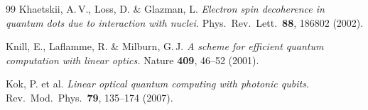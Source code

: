 \begin{thebibliography}{99}
Khaetskii, A.\,V., Loss, D. \& Glazman, L.
\textit{Electron spin decoherence in quantum dots due to interaction with
nuclei.}
Phys.\ Rev.\ Lett.\ \textbf{88}, 186802 (2002).

Knill, E., Laflamme, R. \& Milburn, G.\,J.
\textit{A scheme for efficient quantum computation with linear optics.}
Nature \textbf{409}, 46--52 (2001).

Kok, P. et al.
\textit{Linear optical quantum computing with photonic qubits.}
Rev.\ Mod.\ Phys.\ \textbf{79}, 135--174 (2007).

\end{thebibliography}
